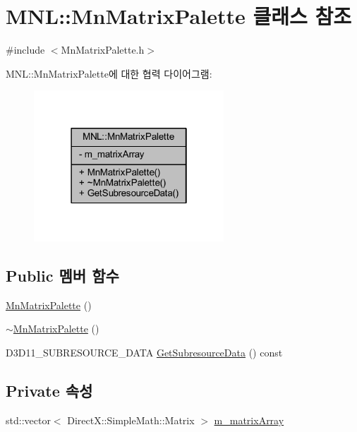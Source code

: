 \hypertarget{class_m_n_l_1_1_mn_matrix_palette}{}\section{M\+NL\+:\+:Mn\+Matrix\+Palette 클래스 참조}
\label{class_m_n_l_1_1_mn_matrix_palette}


{\ttfamily \#include $<$Mn\+Matrix\+Palette.\+h$>$}



M\+NL\+:\+:Mn\+Matrix\+Palette에 대한 협력 다이어그램\+:\nopagebreak
\begin{figure}[H]
\begin{center}
\leavevmode
\includegraphics[width=202pt]{class_m_n_l_1_1_mn_matrix_palette__coll__graph}
\end{center}
\end{figure}
\subsection*{Public 멤버 함수}
\begin{DoxyCompactItemize}
\item 
\hyperlink{class_m_n_l_1_1_mn_matrix_palette_a5952293984870cc9ce39a105370e7012}{Mn\+Matrix\+Palette} ()
\item 
\hyperlink{class_m_n_l_1_1_mn_matrix_palette_a3492e52b69c245bc74f5af5e9913e9c4}{$\sim$\+Mn\+Matrix\+Palette} ()
\item 
D3\+D11\+\_\+\+S\+U\+B\+R\+E\+S\+O\+U\+R\+C\+E\+\_\+\+D\+A\+TA \hyperlink{class_m_n_l_1_1_mn_matrix_palette_ad7ffb57f4795ced63d95eb0fef6220aa}{Get\+Subresource\+Data} () const
\end{DoxyCompactItemize}
\subsection*{Private 속성}
\begin{DoxyCompactItemize}
\item 
std\+::vector$<$ Direct\+X\+::\+Simple\+Math\+::\+Matrix $>$ \hyperlink{class_m_n_l_1_1_mn_matrix_palette_a75048f096e7fe205df32f0603f96a50a}{m\+\_\+matrix\+Array}
\end{DoxyCompactItemize}


